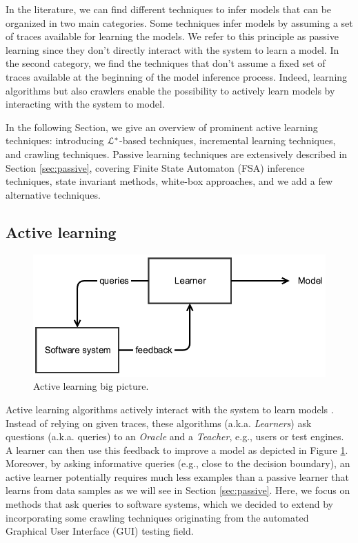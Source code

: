 In the literature, we can find different techniques to infer
models that can be organized in two main categories. Some
techniques infer models by assuming a set of traces available for
learning the models. We refer to this principle as passive
learning since they don't directly interact with the system to
learn a model. In the second category, we find the techniques
that don't assume a fixed set of traces available at the
beginning of the model inference process. Indeed, learning
algorithms but also crawlers enable the possibility to actively
learn models by interacting with the system to model.

In the following Section, we give an overview of prominent active
learning techniques: introducing $\EuScript{L}^*$-based
techniques, incremental learning techniques, and crawling
techniques.
Passive learning techniques are extensively described in Section
\ref{sec:passive}, covering Finite State Automaton (FSA)
inference techniques, state invariant methods, white-box
approaches, and we add a few alternative techniques.


\subsection{Active learning}
\label{sec:active}

\begin{figure}[h]
    \begin{center}
        \includegraphics[width=0.9\linewidth]{figures/active.png}
    \end{center}

    \caption{Active learning big picture.}
    \label{fig:active}
\end{figure}

Active learning algorithms actively interact with the system to
learn models \cite{settles.tr09}. Instead of relying on given
traces, these algorithms (a.k.a. \textit{Learners}) ask questions
(a.k.a.  queries) to an \textit{Oracle} and a \textit{Teacher},
e.g., users or test engines. A learner can then use this feedback
to improve a model as depicted in Figure \ref{fig:active}.
Moreover, by asking informative queries (e.g., close to the
decision boundary), an active learner potentially requires much
less examples than a passive learner that learns from data
samples as we will see in Section \ref{sec:passive}. Here, we
focus on methods that ask queries to software systems, which we
decided to extend by incorporating some crawling techniques
originating from the automated Graphical User Interface (GUI)
testing field.

